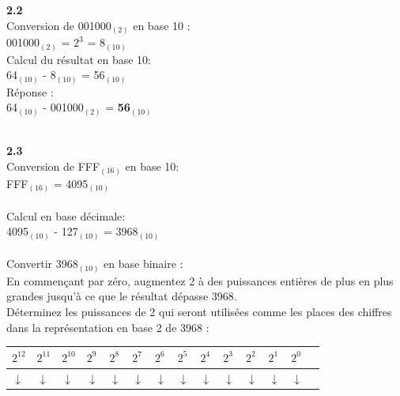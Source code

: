 \begin{Exercice}[20 minutes]
\begin{solution}
         \textbf{2.2}\\
        Conversion de 001000$_{(2)}$ en base 10 :\\
        001000$_{(2)}$ = $2^3$ = 8$_{(10)}$\\
        
        Calcul du résultat en base 10:\\
        64$_{(10)}$ - 8$_{(10)}$ = 56$_{(10)}$\\
        
        Réponse : \\
        64$_{(10)}$ - 001000$_{(2)}$ = \textbf{56$_{(10)}$}\\\\
    \end{solution}

    \begin{solution}
        \textbf{2.3}\\
        Conversion de FFF$_{(16)}$ en base 10:\\
        FFF$_{(16)}$ = 4095$_{(10)}$\\\\
        Calcul en base décimale:\\
        4095$_{(10)}$ - 127$_{(10)}$ = 3968$_{(10)}$\\\\
        Convertir 3968$_{(10)}$ en base binaire :\\
        En commençant par zéro, augmentez 2 à des puissances entières de plus en plus grandes jusqu'à ce que le résultat dépasse 3968.\\
        Déterminez les puissances de 2 qui seront utilisées comme les places des chiffres dans la représentation en base 2 de 3968 :
        \begin{tabular}
            {| C{0.06\textwidth} | C{0.06\textwidth} | C{0.06\textwidth} | C{0.04\textwidth} | C{0.04\textwidth} | C{0.04\textwidth} | C{0.035\textwidth} | C{0.035\textwidth} | C{0.035\textwidth} | C{0.035\textwidth} | C{0.035\textwidth} | C{0.035\textwidth} | C{0.035\textwidth} | C{0.035\textwidth} |} 
            \hline
             $2^{12}$ & $2^{11}$ & $2^{10}$ & $2^9$ & $2^8$ & $2^7$ & $2^6$ & $2^5$ & $2^4$ & $2^{3}$ & $2^2$ & $2^1$ & $2^0$\\ [0.5ex]
            \hline
            $\downarrow$ & $\downarrow$ & $\downarrow$ & $\downarrow$ & $\downarrow$ & $\downarrow$ & $\downarrow$ & $\downarrow$ & $\downarrow$ & $\downarrow$ & $\downarrow$ & $\downarrow$ & $\downarrow$\\ [0.5ex] 

\end{tabular}
\end{solution}
\end{Exercice}
